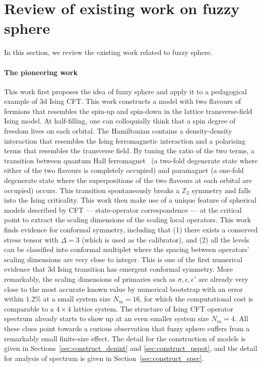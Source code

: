 \documentclass{timesjhep}
\begin{document}
\section{Review of existing work on fuzzy sphere}
\label{sec:review}

In this section, we review the existing work related to fuzzy sphere. 

\paragraph{The pioneering work~\cite{Zhu2022}}

This work first proposes the idea of fuzzy sphere and apply it to a pedagogical example of 3d Ising CFT. This work constructs a model with two flavours of fermions that resembles the spin-up and spin-down in the lattice transverse-field Ising model. At half-filling, one can colloquially think that a spin degree of freedom lives on each orbital. The Hamiltonian contains a density-density interaction that resembles the Ising ferromagnetic interaction and a polarising terms that resembles the transverse field. By tuning the ratio of the two terms, a transition between quantum Hall ferromagnet~\cite{Pasquier2000HallFM,Girvin2010HallFM} (a two-fold degenerate state where either of the two flavours is completely occupied) and paramagnet (a one-fold degenerate state where the superpositions of the two flavours at each orbital are occupied) occurs. This transition spontaneously breaks a $\mathbb{Z}_2$ symmetry and falls into the Ising criticality. This work then make use of a unique feature of spherical models described by CFT --- state-operator correspondence --- at the critical point to extract the scaling dimensions of the scaling local operators. This work finds evidence for conformal symmetry, including that (1) there exists a conserved stress tensor with $\Delta=3$ (which is used as the calibrator), and (2) all the levels can be classified into conformal multiplet where the spacing between operators' scaling dimensions are very close to integer. This is one of the first numerical evidence that 3d Ising transition has emergent conformal symmetry. More remarkably, the scaling dimensions of primaries such as $\sigma,\epsilon,\epsilon'$ are already very close to the most accurate known value by numerical bootstrap with an error within $1.2\%$ at a small system size $N_m=16$, for which the computational cost is comparable to a $4\times4$ lattice system. The structure of Ising CFT operator spectrum already starts to show up at an even smaller system size $N_m=4$. All these clues point towards a curious observation that fuzzy sphere suffers from a remarkably small finite-size effect. The detail for the construction of models is given in Sections~\ref{sec:construct_denint} and \ref{sec:construct_pspot}, and the detail for analysis of spectrum is given in Section~\ref{sec:construct_spec}.
\end{document}
